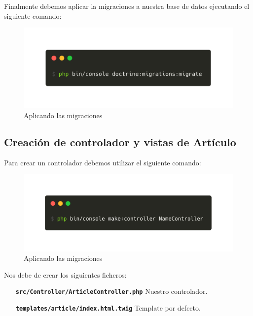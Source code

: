 Finalmente debemos aplicar la migraciones a nuestra base de datos ejecutando el siguiente comando:

\begin{figure}[ht]
  \centering
  \includegraphics[width=\textwidth]{../assets/apply_migration.png}
  \caption{Aplicando las migraciones}
  \label{fig:apply_migration}
\end{figure}
\clearpage
\subsection{Creación de controlador y vistas de Artículo}

Para crear un controlador debemos utilizar el siguiente comando:

\begin{figure}[ht]
  \centering
  \includegraphics[width=\textwidth]{../assets/make_controller.png}
  \caption{Aplicando las migraciones}
  \label{fig:make_controller}
\end{figure}

Nos debe de crear los siguientes ficheros:


\begin{center}
  \begin{minipage}{0.4\textwidth}
    \begin{itemize}
      \item[\texttt{\textbf{src/Controller/ArticleController.php}}] Nuestro controlador.
      \item[\texttt{\textbf{templates/article/index.html.twig}}] Template por defecto.
    \end{itemize}
  \end{minipage}
\end{center}

